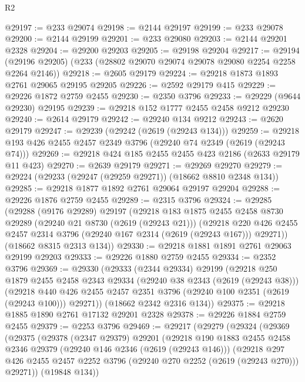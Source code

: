 \begin{lexlean}{R2}
\begin{coremodule}
@29197 := @233 @29074
@29198 := @2144 @29197
@29199 := @233 @29078
@29200 := @2144 @29199
@29201 := @233 @29080
@29203 := @2144 @29201 @2328
@29204 := @29200 @29203
@29205 := @29198 @29204
@29217 := @29194 (@29196 @29205) (@233 (@28802 @29070 @29074 @29078 @29080 @2254 @2258 @2264 @2146))
@29218 := @2605 @29179
@29224 := @29218 @1873 @1893 @2761 @29065 @29195 @29205
@29226 := @2592 @29179 @415
@29229 := @29226 @1872 @2759 @2455
@29230 := @2350 @3796
@29233 := @29229 (@9644 @29230) @29195
@29239 := @29218 @152 @1777 @2455 @2458 @9212 @29230
@29240 := @2614 @29179
@29242 := @29240 @134 @9212
@29243 := @2620 @29179
@29247 := @29239 (@29242 (@2619 (@29243 @134)))
@29259 := @29218 @193 @426 @2455 @2457 @2349 @3796 (@29240 @74 @2349 (@2619 (@29243 @74)))
@29269 := @29218 @424 @185 @2455 @2455 @423 @2186 (@2633 @29179 @11 @423)
@29270 := @2639 @29179
@29271 := @29269 @29270
@29279 := @29224 (@29233 (@29247 (@29259 @29271)) (@18662 @8810 @2348 @134))
@29285 := @29218 @1877 @1892 @2761 @29064 @29197 @29204
@29288 := @29226 @1876 @2759 @2455
@29289 := @2315 @3796
@29324 := @29285
    (@29288
      (@9176 @29289)
      @29197
      (@29218
        @183
        @1875
        @2455
        @2458
        @8730
        @29289
        (@29240 @21 @8730 (@2619 (@29243 @21)))
        (@29218 @220 @426 @2455 @2457 @2314 @3796 (@29240 @167 @2314 (@2619 (@29243 @167))) @29271))
      (@18662 @8315 @2313 @134))
@29330 := @29218 @1881 @1891 @2761 @29063 @29199 @29203
@29333 := @29226 @1880 @2759 @2455
@29334 := @2352 @3796
@29369 := @29330
    (@29333
      (@2344 @29334)
      @29199
      (@29218
        @250
        @1879
        @2455
        @2458
        @2343
        @29334
        (@29240 @38 @2343 (@2619 (@29243 @38)))
        (@29218 @440 @426 @2455 @2457 @2351 @3796 (@29240 @100 @2351 (@2619 (@29243 @100))) @29271))
      (@18662 @2342 @2316 @134))
@29375 := @29218 @1885 @1890 @2761 @17132 @29201 @2328
@29378 := @29226 @1884 @2759 @2455
@29379 := @2253 @3796
@29469 := @29217
    (@29279
      (@29324
        (@29369
          (@29375
            (@29378
              (@2347 @29379)
              @29201
              (@29218
                @190
                @1883
                @2455
                @2458
                @2346
                @29379
                (@29240 @146 @2346 (@2619 (@29243 @146)))
                (@29218
                  @297
                  @426
                  @2455
                  @2457
                  @2252
                  @3796
                  (@29240 @270 @2252 (@2619 (@29243 @270)))
                  @29271))
              (@19848 @134))

\end{coremodule}
\end{lexlean}
